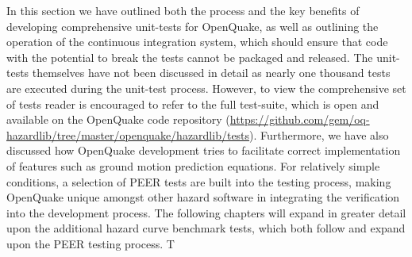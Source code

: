 In this section we have outlined both the process and the key benefits of developing comprehensive unit-tests for OpenQuake, as well as outlining the operation of the continuous integration system, which should ensure that code with the potential to break the tests cannot be packaged and released. The unit-tests themselves have not been discussed in detail as nearly one thousand tests are executed during the unit-test process. However, to view the comprehensive set of tests reader is encouraged to refer to the full test-suite, which is open and available on the OpenQuake code repository (\href{https://github.com/gem/oq-hazardlib/tree/master/openquake/hazardlib/tests}{https://github.com/gem/oq-hazardlib/tree/master/openquake/hazardlib/tests}). Furthermore, we have also discussed how OpenQuake development tries to facilitate correct implementation of features such as ground motion prediction equations. For relatively simple conditions, a selection of PEER tests \citep{thomas2010} are built into the testing process, making OpenQuake unique amongst other hazard software in integrating the verification into the development process. The following chapters will expand in greater detail upon the additional hazard curve benchmark tests, which both follow and expand upon the PEER testing process. T



